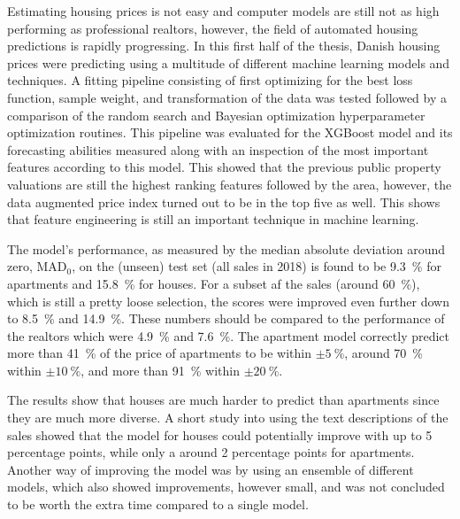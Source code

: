 Estimating housing prices is not easy and computer models are still not as high performing as professional realtors, however, the field of automated housing predictions is rapidly progressing. In this first half of the thesis, Danish housing prices were predicting using a multitude of different machine learning models and techniques. A fitting pipeline consisting of first optimizing for the best loss function, sample weight, and transformation of the data was tested followed by a comparison of the random search and Bayesian optimization hyperparameter optimization routines. This pipeline was evaluated for the XGBoost model and its forecasting abilities measured along with an inspection of the most important features according to this model. This showed that the previous public property valuations are still the highest ranking features followed by the area, however, the data augmented price index turned out to be in the top five as well. This shows that feature engineering is still an important technique in machine learning. 

The model's performance, as measured by the median absolute deviation around zero, $\mathrm{MAD}_0$, on the (unseen) test set (all sales in \num{2018}) is found to be \SI{9.3}{\percent} for apartments and \SI{15.8}{\percent} for houses. For a subset af the sales (around \SI{60}{\percent}), which is still a pretty loose selection, the scores were improved even further down to \SI{8.5}{\percent} and \SI{14.9}{\percent}. These numbers should be compared to the performance of the realtors which were \SI{4.9}{\percent} and \SI{7.6}{\percent}. The apartment model correctly predict more than \SI{41}{\percent} of the price of apartments to be within $\pm \SI{5}{\percent}$, around \SI{70}{\percent} within $\pm \SI{10}{\percent}$, and more than \SI{91}{\percent} within $\pm \SI{20}{\percent}$. 

The results show that houses are much harder to predict than apartments since they are much more diverse. A short study into using the text descriptions of the sales showed that the model for houses could potentially improve with up to \num{5} percentage points, while only a around \num{2} percentage points for apartments. Another way of improving the model was by using an ensemble of different models, which also showed improvements, however small, and was not concluded to be worth the extra time compared to a single model.